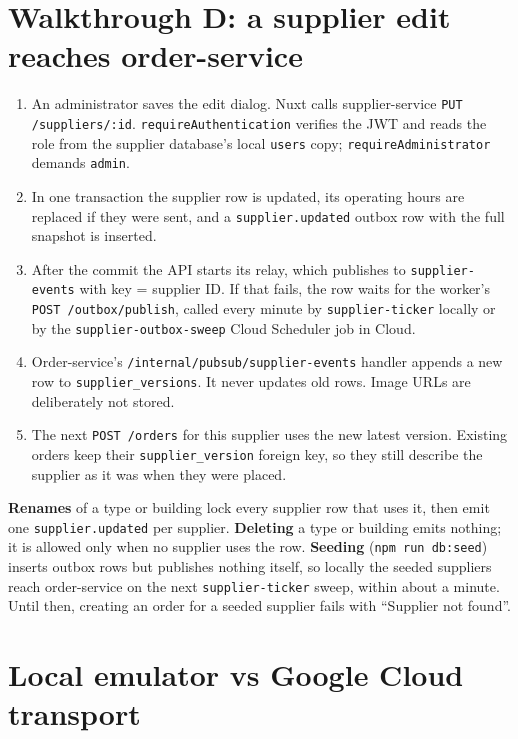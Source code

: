 \documentclass[11pt,a4paper]{article}
\newcommand{\code}[1]{\nolinkurl{#1}}
\begin{document}
\section{Walkthrough D: a supplier edit reaches order-service}
\label{sec:supplier}

\begin{enumerate}
  \item An administrator saves the edit dialog. Nuxt calls supplier-service
  \code{PUT /suppliers/:id}. \code{requireAuthentication} verifies the JWT and reads the
  role from the supplier database's local \code{users} copy;
  \code{requireAdministrator} demands \code{admin}.
  \item In one transaction the supplier row is updated, its operating hours are replaced
  if they were sent, and a \code{supplier.updated} outbox row with the full snapshot is
  inserted.
  \item After the commit the API starts its relay, which publishes to
  \code{supplier-events} with key = supplier ID. If that fails, the row waits for the
  worker's \code{POST /outbox/publish}, called every minute by \code{supplier-ticker}
  locally or by the \code{supplier-outbox-sweep} Cloud Scheduler job in Cloud.
  \item Order-service's \code{/internal/pubsub/supplier-events} handler appends a new row
  to \code{supplier_versions}. It never updates old rows. Image URLs are deliberately not
  stored.
  \item The next \code{POST /orders} for this supplier uses the new latest version.
  Existing orders keep their \code{supplier_version} foreign key, so they still describe
  the supplier as it was when they were placed.
\end{enumerate}

\textbf{Renames} of a type or building lock every supplier row that uses it, then emit
one \code{supplier.updated} per supplier. \textbf{Deleting} a type or building emits
nothing; it is allowed only when no supplier uses the row. \textbf{Seeding}
(\code{npm run db:seed}) inserts outbox rows but publishes nothing itself, so locally the
seeded suppliers reach order-service on the next \code{supplier-ticker} sweep, within
about a minute. Until then, creating an order for a seeded supplier fails with
``Supplier not found''.

\section{Local emulator vs Google Cloud transport}
\label{sec:transport}
\end{document}
